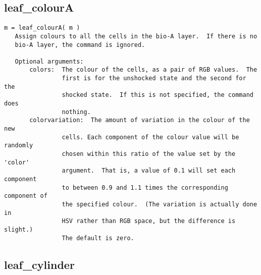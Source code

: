 \subsection{leaf\_colourA}\label{section-leaf-colourA}

\begin{verbatim}
m = leaf_colourA( m )
   Assign colours to all the cells in the bio-A layer.  If there is no
   bio-A layer, the command is ignored.

   Optional arguments:
       colors:  The colour of the cells, as a pair of RGB values.  The
                first is for the unshocked state and the second for the
                shocked state.  If this is not specified, the command does
                nothing.
       colorvariation:  The amount of variation in the colour of the new
                cells. Each component of the colour value will be randomly
                chosen within this ratio of the value set by the 'color'
                argument.  That is, a value of 0.1 will set each component
                to between 0.9 and 1.1 times the corresponding component of
                the specified colour.  (The variation is actually done in
                HSV rather than RGB space, but the difference is slight.)
                The default is zero.
\end{verbatim}

\subsection{leaf\_cylinder}\label{section-leaf-cylinder}

